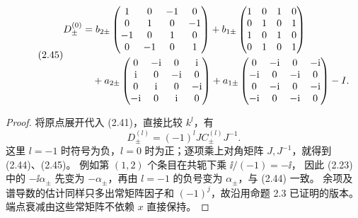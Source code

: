 \begin{equation}
\originaleq{2.45}
\begin{aligned}
D_\pm^{(0)}
&=b_{2\pm}\begin{pmatrix}1&0&-1&0\\0&1&0&-1\\-1&0&1&0\\0&-1&0&1\end{pmatrix}
+b_{1\pm}\begin{pmatrix}1&0&1&0\\0&1&0&1\\1&0&1&0\\0&1&0&1\end{pmatrix}\\
&\quad+a_{2\pm}\begin{pmatrix}0&-\ii&0&\ii\\\ii&0&-\ii&0\\0&\ii&0&-\ii\\-\ii&0&\ii&0\end{pmatrix}
+a_{1\pm}\begin{pmatrix}0&-\ii&0&-\ii\\-\ii&0&-\ii&0\\0&-\ii&0&-\ii\\-\ii&0&-\ii&0\end{pmatrix}-I.
\end{aligned}
\end{equation}
\begin{proof}
将原点展开代入 (2.41)，直接比较 $k^l$，有
\[
D_\pm^{(l)}=(-1)^lJC_\pm^{(l)}J^{-1}.
\]
这里 $l=-1$ 时符号为负，$l=0$ 时为正；逐项乘上对角矩阵 $J,J^{-1}$，就得到 (2.44)、(2.45)。
例如第 $(1,2)$ 个条目在共轭下乘 $\ii/(-1)=-\ii$，
因此 (2.23) 中的 $-\ii\alpha_\pm$ 先变为 $-\alpha_\pm$，再由 $l=-1$ 的负号变为 $\alpha_\pm$，与 (2.44) 一致。
余项及谱导数的估计同样只多出常矩阵因子和 $(-1)^j$，故沿用命题 2.3 已证明的版本。
端点衰减由这些常矩阵不依赖 $x$ 直接保持。
\end{proof}

